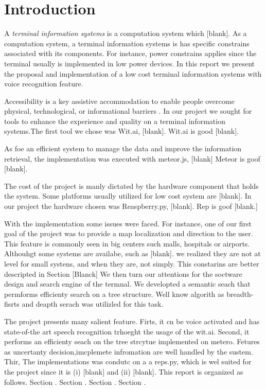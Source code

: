 %
\chapter{Introduction}
\label{sec:intro}


A \emph{terminal information systems} is a computation system which [blank].
As a computation system, a terminal information systems is has specific constrains associated with its components.
For instance, power constrains applies since the terminal usually is implemented in low power devices.
In this report we present the proposal and implementation of a low cost terminal information systems with voice recognition feature.

Accessibility is a key assistive accommodation to enable people  overcome physical, technological, or informational barriers \cite{acessguide13}.
In our project we sought for tools to enhance the experience and quality on a terminal information systems.The first tool we chose was Wit.ai, [blank].
Wit.ai is good [blank].

As foe an efficient system to manage the data and improve the information retrieval, the implementation was executed with meteor.js, [blank]
Meteor is goof [blank].

The cost of the project is manly dictated by the hardware component that holds the system.
Some platforms usually utilized for low cost system are [blank].
In our project the hardware chosen was Reaspberry.py, [blank].
Rep is goof [blank.]

With the implementation some issues were faced.
For instance, one of our first goal of the project was to provide a map localization and direction to the user.
This feature is commonly seen in big centers such malls, hospitals or airports.
Althouhgt some systems are availabe, such as [blank]. we realized they are not at level for small systens, and when they are, not simply. This constarins are better descripted in Section [Blanck]
We then turn our attentions for the soctware design and search engine of the termnal.
We developted a semantic seach that permforms efficienty search on a tree structure.
Well know algorith as breadth-fisrts and deapth serach was utilizled for this task.

The project presents many salient feature.
Firts, it cn be voice activated and has state-of-the art speech recognition trhoeght the usage of the wit.ai.
Second, it performs an efficienty seach on the tree strcytue implemented on metero. 
Fetures as uncertanty decision,imcplemete infromation are well handled by the sustem.
Thir, The implementations was condutc on a a reps.py, which is wel suited for the project since it is (i) [blank] and (ii) [blank].
This report is organized as follows.
Section .
Section .
Section .
Section .


